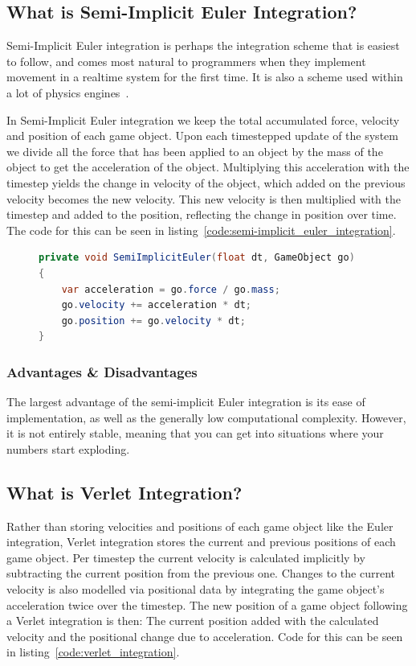 \subsection{What is Semi-Implicit Euler Integration?}
Semi-Implicit Euler integration is perhaps the integration scheme that is easiest to follow, and comes most natural to programmers when they implement
movement in a realtime system for the first time. It is also a scheme used within a lot of physics engines~\cite{gafferongames_integration}.

In Semi-Implicit Euler integration we keep the total accumulated force, velocity and position of each game object.
Upon each timestepped update of the system we divide all the force that has been applied to an object by the mass of the object to get the acceleration of the object.
Multiplying this acceleration with the timestep yields the change in velocity of the object, which added on the previous velocity becomes the new velocity.
This new velocity is then multiplied with the timestep and added to the position, reflecting the change in position over time.
The code for this can be seen in listing~\ref{code:semi-implicit_euler_integration}.

\begin{figure}
\begin{lstlisting}[label={code:semi-implicit_euler_integration},language=csharp,caption={Semi-Implicit Euler Integration}]
private void SemiImplicitEuler(float dt, GameObject go)
{
    var acceleration = go.force / go.mass;
    go.velocity += acceleration * dt;
    go.position += go.velocity * dt;
}
\end{lstlisting}
\end{figure}

\subsubsection{Advantages \& Disadvantages}
The largest advantage of the semi-implicit Euler integration is its ease of implementation, as well as the generally low computational complexity.
However, it is not entirely stable, meaning that you can get into situations where your numbers start exploding.

\subsection{What is Verlet Integration?}
Rather than storing velocities and positions of each game object like the Euler integration, Verlet integration stores the current and previous positions of each game object.
Per timestep the current velocity is calculated implicitly by subtracting the current position from the previous one.
Changes to the current velocity is also modelled via positional data by integrating the game object's acceleration twice over the timestep.
The new position of a game object following a Verlet integration is then: The current position added with the calculated velocity and the positional change due to acceleration.
Code for this can be seen in listing~\ref{code:verlet_integration}.

